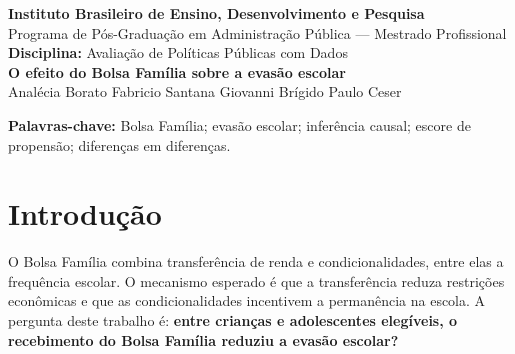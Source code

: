 \documentclass[12pt,a4paper]{article}
\begin{document}
\begin{center}
{\large \textbf{Instituto Brasileiro de Ensino, Desenvolvimento e Pesquisa}}\\[0.15cm]
{\large Programa de Pós-Graduação em Administração Pública --- Mestrado Profissional}\\[0.35cm]
{\normalsize \textbf{Disciplina:} Avaliação de Políticas Públicas com Dados}\\[0.45cm]
{\Large \textbf{O efeito do Bolsa Família sobre a evasão escolar}}\\[0.25cm]
{\normalsize Analécia Borato \quad Fabricio Santana \quad Giovanni Brígido \quad Paulo Ceser}
\end{center}

\begin{abstract}
Este trabalho estima o efeito do Bolsa Família sobre a evasão escolar utilizando duas estratégias de inferência causal: um ATT observacional ajustado por escore de propensão e diferenças em diferenças em um painel domiciliar. A análise observacional compara crianças e adolescentes beneficiários a indivíduos de domicílios cadastrados no Cadastro Único, usando pareamento e ponderação IPW. A análise longitudinal compara a evolução da evasão média entre domicílios beneficiários e um grupo de controle cadastrado entre 2005 e 2009. Os resultados apontam na direção de menor evasão entre beneficiários: aproximadamente -1,11 ponto percentual no IPW-ATT e -0,56 ponto percentual no DiD. Contudo, os intervalos de confiança incluem zero. A evidência é compatível com um efeito favorável modesto, mas não é conclusiva devido às hipóteses de ignorabilidade, tendências paralelas, mensuração e seleção amostral.
\end{abstract}

\noindent\textbf{Palavras-chave:} Bolsa Família; evasão escolar; inferência causal; escore de propensão; diferenças em diferenças.

\section{Introdução}

O Bolsa Família combina transferência de renda e condicionalidades, entre elas a frequência escolar. O mecanismo esperado é que a transferência reduza restrições econômicas e que as condicionalidades incentivem a permanência na escola. A pergunta deste trabalho é: \textbf{entre crianças e adolescentes elegíveis, o recebimento do Bolsa Família reduziu a evasão escolar?}
\end{document}
